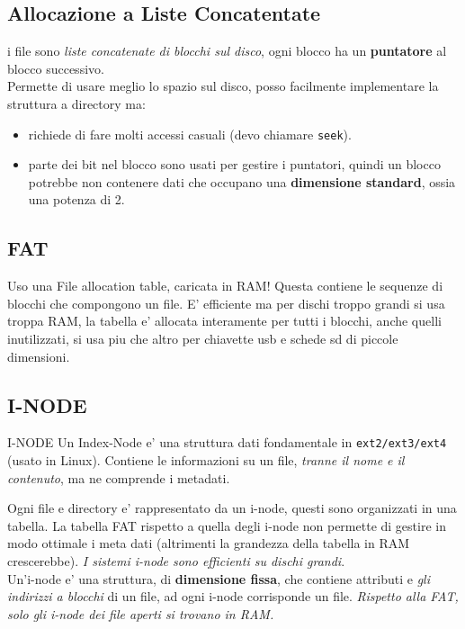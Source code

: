 \subsection{Allocazione a Liste Concatentate}
i file sono \textit{liste concatenate di blocchi sul disco}, ogni blocco ha un \textbf{puntatore} al blocco successivo. \\

Permette di usare meglio lo spazio sul disco, posso facilmente implementare la struttura a directory ma:
\begin{itemize}
    \item richiede di fare molti accessi casuali (devo chiamare \texttt{seek}).
    \item parte dei bit nel blocco sono usati per gestire i puntatori, quindi un blocco potrebbe non contenere dati che occupano una \textbf{dimensione standard}, ossia una potenza di 2. 
\end{itemize} 

\subsection{FAT}
Uso una File allocation table, caricata in RAM! Questa contiene le sequenze di blocchi che compongono un file.
E' efficiente ma per dischi troppo grandi si usa troppa RAM, la tabella e' allocata interamente per tutti i blocchi, anche
quelli inutilizzati, si usa piu che altro per chiavette usb e schede sd di piccole dimensioni.

\subsection{I-NODE}
\begin{definition} I-NODE
    Un Index-Node e' una struttura dati fondamentale in \texttt{ext2/ext3/ext4} (usato in Linux). 
    Contiene le informazioni su un file, \textit{tranne il nome e il contenuto}, ma ne comprende i metadati.
\end{definition}

Ogni file e directory e' rappresentato da un i-node, questi sono organizzati in una tabella. 
La tabella FAT rispetto a quella degli i-node non permette di gestire in modo ottimale i meta dati (altrimenti la grandezza della tabella in RAM crescerebbe).
\textit{I sistemi i-node sono efficienti su dischi grandi}. \\

Un'i-node e' una struttura, di \textbf{dimensione fissa}, che contiene attributi e \textit{gli indirizzi a blocchi} di un file, ad ogni i-node corrisponde un file.
\textit{Rispetto alla FAT, solo gli i-node dei file aperti si trovano in RAM.} \\

